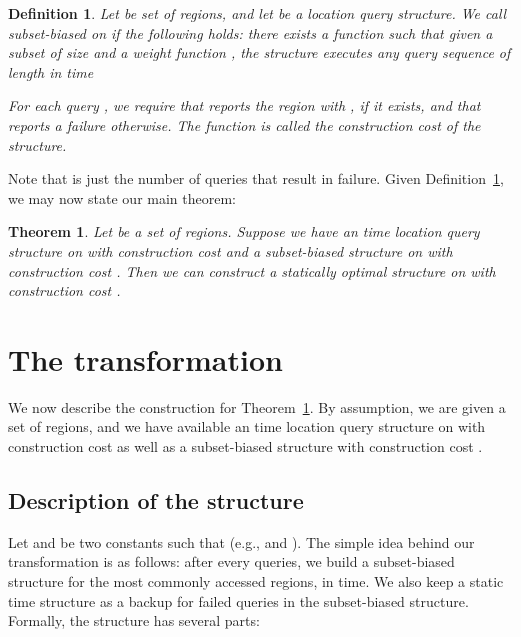\documentclass[11pt]{article}
\newtheorem{theorem}[figure]{Theorem}
\newtheorem{definition}[figure]{Definition}
\begin{document}
\begin{definition}\label{def:subset_biased}
Let  be set of  regions, and let  be a location
query structure. We call  
\emph{subset-biased} on  if the following holds:
there exists a function 
such that given a subset  of size  and a weight
function , the structure  executes
any query sequence  of length 
in time

For each query , we require that  reports the
region  with , if it exists, 
and that  reports
a failure otherwise.
The function
 is called the \emph{construction cost} of the structure.  
\end{definition}

\noindent 
Note that  is just the number of queries 
that result in failure. Given Definition~\ref{def:subset_biased}, we may 
now state our main theorem:

\begin{theorem} \label{main} 
Let  be a set of  regions.
Suppose we
have an  time location query structure 
on  with construction cost  and a subset-biased structure on 
with construction cost . Then we can construct
a statically optimal structure on  with construction cost .  
\end{theorem}



\section{The transformation}

We now describe the construction for Theorem~\ref{main}. 
By assumption, we are given a set  of  regions, and we
have available an  time location query structure  on  with 
construction cost  as well as a 
subset-biased structure with construction 
cost .

\subsection{Description of the structure}

Let  and  be two constants
such that  (e.g.,  and
).
The simple idea behind our transformation is as follows:
after every   queries, we build a subset-biased  
structure for the  most commonly accessed regions,
in  time.
We also keep a static  time structure as a backup for 
failed queries in the subset-biased structure.  
Formally, the structure has several parts:
\end{document}
